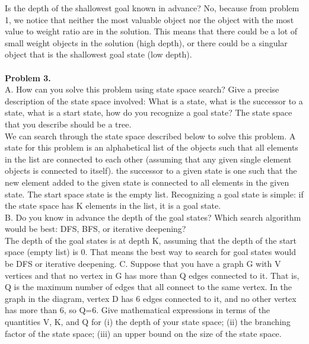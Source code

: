 \documentclass{article}
\begin{document}
Is the depth of the shallowest goal known in advance? No, because from problem 1, we notice that neither the most valuable object nor the object with the most value to weight ratio are in the solution. This means that there could be a lot of small weight objects in the solution (high depth), or there could be a singular object that is the shallowest goal state (low depth).\\
\\
\textbf{Problem 3.}\\
A. How can you solve this problem using state space search? Give a precise description of the state space involved: What is a state, what is the successor to a state, what is a start state, how do you recognize a goal state? The state space that you describe should be a tree.\\
We can search through the state space described below to solve this problem. A state for this problem is an alphabetical list of the objects such that all elements in the list are connected to each other (assuming that any given single element objects is connected to itself). the successor to a given state is one such that the new element added to the given state is connected to all elements in the given state. The start space state is the empty list. Recognizing a goal state is simple: if the state space has K elements in the list, it is a goal state.\\
B. Do you know in advance the depth of the goal states? Which search algorithm would be best: DFS, BFS, or iterative deepening?\\
The depth of the goal states is at depth K, assuming that the depth of the start space (empty list) is 0. That means the best way to search for goal states would be DFS or iterative deepening.
C. Suppose that you have a graph G with V vertices and that no vertex in G has more than Q edges connected to it. That is, Q is the maximum number of edges that all connect to the same vertex. In the graph in the diagram, vertex D has 6 edges connected to it, and no other vertex has more than 6, so Q=6. Give mathematical expressions in terms of the quantities V, K, and Q for (i) the depth of your state space; (ii) the branching factor of the state space; (iii) an upper bound on the size of the state space.
\end{document}
